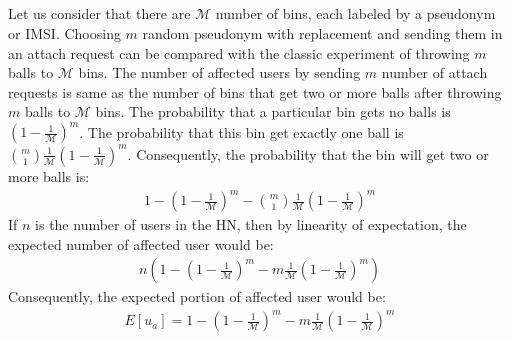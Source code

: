 \documentclass{llncs} %
\begin{document}
\begin{subappendices}
\renewcommand{\thesection}{\Alph{section}}%

\section{} \label{appendix:A}
Let us consider that there are $\mathcal{M}$ number of bins, each labeled by a pseudonym or IMSI. Choosing $m$ random pseudonym with replacement and sending them in an attach request can be compared with the classic experiment of throwing $m$ balls to $\mathcal{M}$ bins. The number of affected users by sending $m$ number of attach requests is same as the number of bins that get two or more balls after throwing $m$ balls to $\mathcal{M}$ bins. The probability that a particular bin gets no balls is $\left(1-\frac{1}{\mathcal{M}}\right)^m$. The probability that this bin get exactly one ball is $\binom{m}{1}\frac{1}{\mathcal{M}}\left(1-\frac{1}{\mathcal{M}}\right)^m$. Consequently, the probability that the bin will get two or more balls is:
\begin{eqnarray*}
 1 - \left(1-\frac{1}{\mathcal{M}}\right)^m - \binom{m}{1}\frac{1}{\mathcal{M}}\left(1-\frac{1}{\mathcal{M}}\right)^m
\end{eqnarray*}
If $n$ is the number of users in the HN, then by linearity of expectation, the expected number of affected user would be:
\begin{eqnarray*}
 n\left(1 - \left(1-\frac{1}{\mathcal{M}}\right)^m - m\frac{1}{\mathcal{M}}\left(1-\frac{1}{\mathcal{M}}\right)^m\right)
\end{eqnarray*}
Consequently, the expected portion of affected user would be:
\begin{eqnarray*}
 E[u_a] = 1 - \left(1-\frac{1}{\mathcal{M}}\right)^m - m\frac{1}{\mathcal{M}}\left(1-\frac{1}{\mathcal{M}}\right)^m
\end{eqnarray*}



\end{subappendices}
\end{document}
